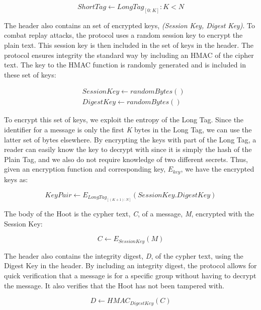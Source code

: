 \documentclass{acm_proc_article-sp}
\begin{document}
\begin{equation}
	ShortTag \leftarrow LongTag_{[0:K]} : K < N
\end{equation}

The header also contains an set of encrypted keys, \textit{(Session Key, Digest Key)}. To combat replay attacks, the protocol uses a random session key to encrypt the plain text. This session key is then included in the set of keys in the header. The protocol ensures integrity the standard way by including an HMAC of the cipher text. The key to the HMAC function is randomly generated and is included in these set of keys: 

\begin{align}
	& SessionKey \leftarrow randomBytes() \\
	& Digest Key \leftarrow randomBytes()
\end{align}

To encrypt this set of keys, we exploit the entropy of the Long Tag. Since the identifier for a message is only the first \textit{K} bytes in the Long Tag, we can use the latter set of bytes elsewhere. By encrypting the keys with part of the Long Tag, a reader can easily know the key to decrypt with since it is simply the hash of the Plain Tag, and we also do not require knowledge of two different secrets. Thus, given an encryption function and corresponding key, \textit{$E_{key}$}, we have the encrypted keys as:

\begin{equation}
	KeyPair \leftarrow E_{LongTag_{[(K+1):N]}}(SessionKey.DigestKey)
\end{equation}

The body of the Hoot is the cypher text, \textit{C}, of a message, \textit{M}, encrypted with the Session Key:

\begin{equation}
	C \leftarrow E_{SessionKey}(M)
\end{equation}

The header also contains the integrity digest, \textit{D}, of the cypher text, using the Digest Key in the header. By including an integrity digest, the protocol allows for quick verification that a message is for a specific group without having to decrypt the message. It also verifies that the Hoot has not been tampered with. 

\begin{equation}
	D \leftarrow HMAC_{DigestKey}(C)
\end{equation}
\end{document}
